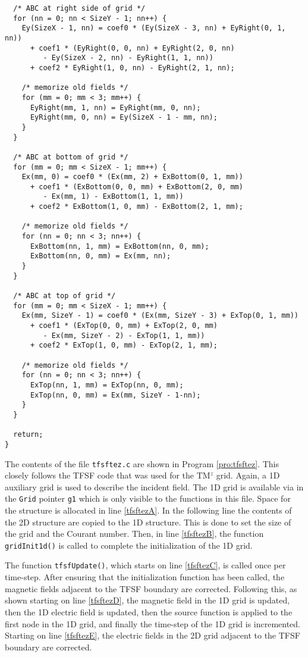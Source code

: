 \begin{program}
\begin{lstlisting}
  /* ABC at right side of grid */
  for (nn = 0; nn < SizeY - 1; nn++) {
    Ey(SizeX - 1, nn) = coef0 * (Ey(SizeX - 3, nn) + EyRight(0, 1, nn))
      + coef1 * (EyRight(0, 0, nn) + EyRight(2, 0, nn)
		 - Ey(SizeX - 2, nn) - EyRight(1, 1, nn))
      + coef2 * EyRight(1, 0, nn) - EyRight(2, 1, nn);
    
    /* memorize old fields */
    for (mm = 0; mm < 3; mm++) {
      EyRight(mm, 1, nn) = EyRight(mm, 0, nn);
      EyRight(mm, 0, nn) = Ey(SizeX - 1 - mm, nn);
    }
  }

  /* ABC at bottom of grid */
  for (mm = 0; mm < SizeX - 1; mm++) {
    Ex(mm, 0) = coef0 * (Ex(mm, 2) + ExBottom(0, 1, mm))
      + coef1 * (ExBottom(0, 0, mm) + ExBottom(2, 0, mm)
		 - Ex(mm, 1) - ExBottom(1, 1, mm))
      + coef2 * ExBottom(1, 0, mm) - ExBottom(2, 1, mm);
    
    /* memorize old fields */ 
    for (nn = 0; nn < 3; nn++) {
      ExBottom(nn, 1, mm) = ExBottom(nn, 0, mm);
      ExBottom(nn, 0, mm) = Ex(mm, nn);
    }
  }
  
  /* ABC at top of grid */
  for (mm = 0; mm < SizeX - 1; mm++) {
    Ex(mm, SizeY - 1) = coef0 * (Ex(mm, SizeY - 3) + ExTop(0, 1, mm))
      + coef1 * (ExTop(0, 0, mm) + ExTop(2, 0, mm)
		 - Ex(mm, SizeY - 2) - ExTop(1, 1, mm))
      + coef2 * ExTop(1, 0, mm) - ExTop(2, 1, mm);
    
    /* memorize old fields */
    for (nn = 0; nn < 3; nn++) {
      ExTop(nn, 1, mm) = ExTop(nn, 0, mm);
      ExTop(nn, 0, mm) = Ex(mm, SizeY - 1-nn);
    }
  }
  
  return;
}
\end{lstlisting}
\end{program}

The contents of the file {\tt tfsftez.c} are shown in Program
\ref{pro:tfsftez}.  This closely follows the TFSF code that was used
for the TM$^z$ grid.  Again, a 1D auxiliary grid is used to describe
the incident field.  The 1D grid is available via in the {\tt Grid}
pointer {\tt g1} which is only visible to the functions in this file.
Space for the structure is allocated in line \ref{tfsftezA}.  In the
following line the contents of the 2D structure are copied to the 1D
structure.  This is done to set the size of the grid and the Courant
number.  Then, in line \ref{tfsftezB}, the function {\tt gridInit1d()}
is called to complete the initialization of the 1D grid.

The function {\tt tfsfUpdate()}, which starts on line \ref{tfsftezC},
is called once per time-step.  After ensuring that the initialization
function has been called, the magnetic fields adjacent to the TFSF
boundary are corrected.  Following this, as shown starting on line
\ref{tfsftezD}, the magnetic field in the 1D grid is updated, then the
1D electric field is updated, then the source function is applied to
the first node in the 1D grid, and finally the time-step of the 1D
grid is incremented.  Starting on line \ref{tfsftezE}, the electric
fields in the 2D grid adjacent to the TFSF boundary are corrected.


